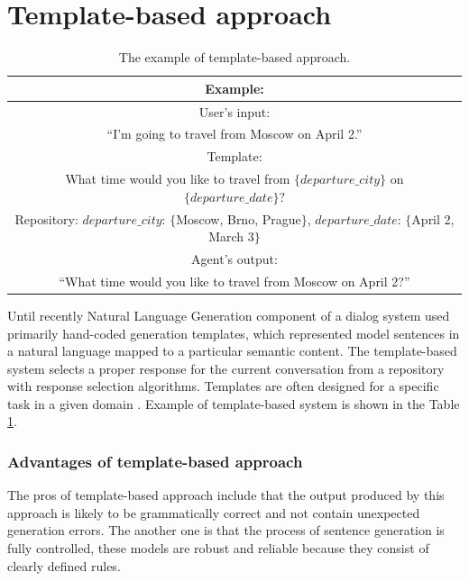 \section{Template-based approach} 

\begin{table}[ht]
\centering
 \begin{tabular}{|c|} 
 \hline
 Example: \\
 \hline
 User's input: \\
 ``I'm going to travel from Moscow on April 2.'' \\ 
 \hline
 Template: \\
 What time would you like to travel from $\{departure\_city\}$ on $\{departure\_date\}?$ \\
 Repository: $departure\_city$: $\{$Moscow, Brno, Prague$\}$, $departure\_date$: $\{$April 2, March 3$\}$ \\
 \hline
 Agent's output:\\
 ``What time would you like to travel from Moscow on April 2?'' \\
 \hline
 \end{tabular}
 \caption{The example of template-based approach.}
\label{tab:tb_example}
\end{table}

Until recently Natural Language Generation component of a dialog system used primarily hand-coded generation templates, which represented model sentences in a natural language mapped to a particular semantic content.
The template-based system selects a proper response for the current conversation from a repository with response selection algorithms. Templates are often designed for a specific task in a given domain \cite{manishina2016data}. 
Example of template-based system is shown in the Table \ref{tab:tb_example}.


\subsubsection{Advantages of template-based approach}
The pros of template-based approach include that the output produced by this approach is likely to be grammatically correct and not contain unexpected generation errors. The another one is that the process of sentence generation is fully controlled, these models are robust and reliable because they consist of clearly defined rules. 

